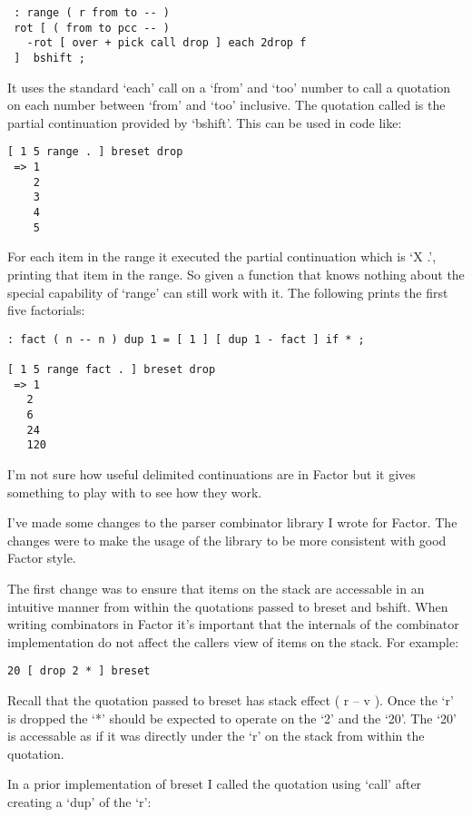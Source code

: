 \begin{verbatim}
 : range ( r from to -- )
 rot [ ( from to pcc -- )
   -rot [ over + pick call drop ] each 2drop f
 ]  bshift ;
\end{verbatim}


It uses the standard `each' call on a `from' and `too' number to call
a quotation on each number between `from' and `too' inclusive. The
quotation called is the partial continuation provided by
`bshift'. This can be used in code like:

\begin{verbatim}
[ 1 5 range . ] breset drop
 => 1
    2
    3
    4
    5
\end{verbatim}


For each item in the range it executed the partial continuation which
is `X .', printing that item in the range. So given a function that
knows nothing about the special capability of `range' can still work
with it. The following prints the first five factorials:

\begin{verbatim}
: fact ( n -- n ) dup 1 = [ 1 ] [ dup 1 - fact ] if * ;

[ 1 5 range fact . ] breset drop
 => 1
   2
   6
   24
   120
\end{verbatim}


I'm not sure how useful delimited continuations are in Factor but it
 gives something to play with to see how they work.

I've made some changes to the parser combinator library I wrote for
 Factor. The changes were to make the usage of the library to be more
 consistent with good Factor style.

The first change was to ensure that items on the stack are accessable
 in an intuitive manner from within the quotations passed to breset
 and bshift. When writing combinators in Factor it's important that
 the internals of the combinator implementation do not affect the
 callers view of items on the stack. For example:

\begin{verbatim}
20 [ drop 2 * ] breset
\end{verbatim}


Recall that the quotation passed to breset has stack effect ( r -- v
). Once the `r' is dropped the `*' should be expected to operate on
the `2' and the `20'. The `20' is accessable as if it was directly
under the `r' on the stack from within the quotation.

In a prior implementation of breset I called the quotation using
`call' after creating a `dup' of the `r':



